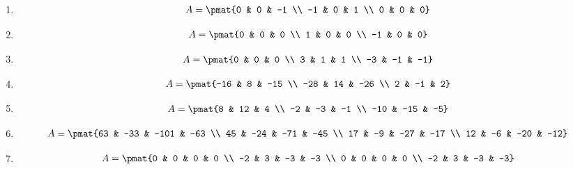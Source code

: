 \begin{enumerate}
\item

\begin{align*}
A = \pmat{0 & 0 & -1 \\ -1 & 0 & 1 \\ 0 & 0 & 0}
\end{align*}

\item

\begin{align*}
A = \pmat{0 & 0 & 0 \\ 1 & 0 & 0 \\ -1 & 0 & 0}
\end{align*}

\item

\begin{align*}
A = \pmat{0 & 0 & 0 \\ 3 & 1 & 1 \\ -3 & -1 & -1}
\end{align*}

\item

\begin{align*}
A = \pmat{-16 & 8 & -15 \\ -28 & 14 & -26 \\ 2 & -1 & 2}
\end{align*}

\item

\begin{align*}
A = \pmat{8 & 12 & 4 \\ -2 & -3 & -1 \\ -10 & -15 & -5}
\end{align*}

\item

\begin{align*}
A = \pmat{63 & -33 & -101 & -63 \\ 45 & -24 & -71 & -45 \\ 17 & -9 & -27 & -17 \\ 12 & -6 & -20 & -12}
\end{align*}

\item

\begin{align*}
A = \pmat{0 & 0 & 0 & 0 \\ -2 & 3 & -3 & -3 \\ 0 & 0 & 0 & 0 \\ -2 & 3 & -3 & -3}
\end{align*}


\end{enumerate}

